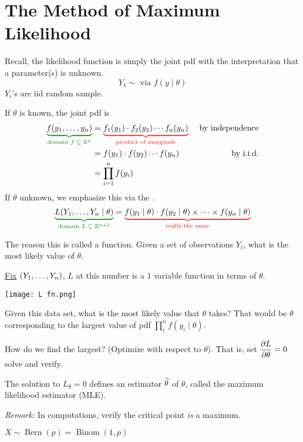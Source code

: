 \section{The Method of Maximum Likelihood}%
Recall, the likelihood function is simply the joint pdf with the interpretation that a parameter(s) is unknown.
$$Y_1 \sim \text{ via } f(y \mid \theta)$$
$Y_i$'s are iid random sample.

\nl If $\theta$ is known, the joint pdf is
\begin{align}
    \setGreen \underbrace{\setBlack f(\thru{y})}_{\text{domain } f\; \subseteq\; \R^n}\setBlack  &= \color{red} \underbrace{\setBlack f_1(y_1) \cdot f_2(y_2) \cdots f_n(y_n)}_{\text{product of marginals}} & \text{ by independence}\notag\\
    &= f(y_1) \cdot f(y_2) \cdots f(y_n) & \text{by i.i.d.}\notag\\
    &= \prod_{i=1}^n f(y_i)\notag
\end{align}
If $\theta$ unknown, we emphasize this via the .
$$\setGreen \underbrace{ \setBlack L(\thru{Y} \mid \theta) }_{\text{domain } L\; \subseteq\; \R^{n+1}} \setBlack = \color{red} \underbrace{\setBlack f(y_1 \mid \theta) \cdot f(y_2 \mid \theta) \times \cdots\times f(y_n \mid \theta)}_{\text{really the same}}$$

\disc The reason this is called a  function. Given a set of observations $Y_i$, what is the most likely value of $\theta$. 

\nl \underline{Fix} $({Y}_1, \dots, {Y}_n)$, $L$ at this number is a 1 variable function in terms of $\theta$.
\begin{center}
\texttt{[image: L fn.png]}
\end{center}
\nl Given this data set, what is the most likely value that $\theta$ takes? That would be $\theta$ corresponding to the largest value of pdf $\prod_i^n f(y_i \mid \theta)$.

\nl How do we find the largest? (\color{red}Optimize with respect to $\theta$\color{black}). That is, set $\displaystyle \pdv{L}{\theta} = 0$ solve and verify.

 The solution to $L_{\theta} = 0$ defines an estimator $\widehat{\theta}$ of $\theta$, called the maximum likelihood estimator (MLE).

\nl \textit{Remark:} In computations, verify the critical point \textit{is} a maximum.

\newpage\noindent\example* $X \sim \operatorname{Bern}(p) = \operatorname{Binom}(1,p)$

